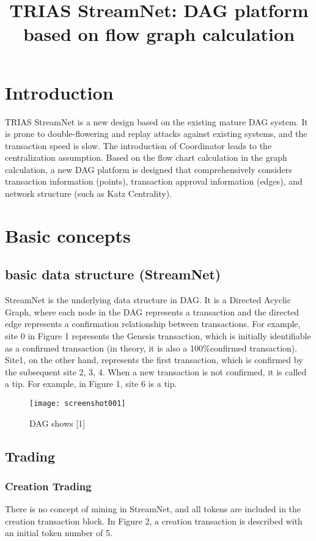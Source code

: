 \documentclass{article}
\begin{document}
\title{TRIAS StreamNet: DAG platform based on flow graph calculation}

\maketitle

\section{Introduction}
TRIAS StreamNet is a new design based on the existing mature DAG system. It is prone to double-flowering and replay attacks against existing systems, and the transaction speed is slow. The introduction of Coordinator leads to the centralization assumption. Based on the flow chart calculation in the graph calculation, a new DAG platform is designed that comprehensively considers transaction information (points), transaction approval information (edges), and network structure (such as Katz Centrality).

\section{Basic concepts}
\subsection{basic data structure (StreamNet)}
StreamNet is the underlying data structure in DAG. It is a Directed Acyclic Graph, where each node in the DAG represents a transaction and the directed edge represents a confirmation relationship between transactions. For example, site 0 in Figure 1 represents the Genesis transaction, which is initially identifiable as a confirmed transaction (in theory, it is also a 100\%confirmed transaction). Site1, on the other hand, represents the first transaction, which is confirmed by the subsequent site 2, 3, 4. When a new transaction is not confirmed, it is called a tip. For example, in Figure 1, site 6 is a tip.


\begin{figure}[H]
	\centering
	\texttt{[image: screenshot001]}
	\caption{DAG shows [1]}
	\label{simulationfigure}
\end{figure}

\subsection{Trading}
\subsubsection{Creation Trading}
There is no concept of mining in StreamNet, and all tokens are included in the creation transaction block. In Figure 2, a creation transaction is described with an initial token number of 5.
\end{document}
